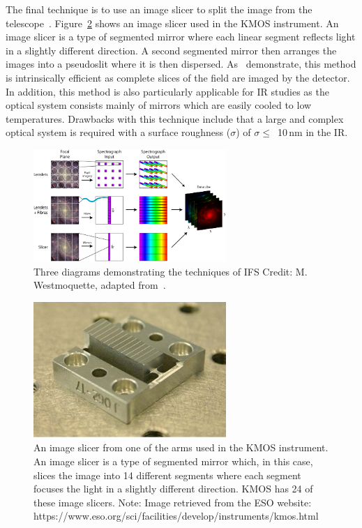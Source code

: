 The final technique is to use an image slicer to split the image from the telescope~\citep{1997SPIE.2871.1295C}.
Figure~\ref{fig:image_slicer} shows an image slicer used in the KMOS instrument.
An image slicer is a type of segmented mirror where each linear segment reflects light in a slightly different direction.
A second segmented mirror then arranges the images into a pseudoslit where it is then dispersed.
As~\cite{2006NewAR..50..244A} demonstrate, this method is intrinsically efficient as complete slices of the field are imaged by the detector.
In addition, this method is also particularly applicable for IR studies as the optical system consists mainly of mirrors which are easily cooled to low temperatures.
Drawbacks with this technique include that a large and complex optical system is required with a surface roughness ($\sigma$) of $\sigma \leq$~10\,nm in the IR.


\begin{figure}
 \centering
 \includegraphics[width=0.65\textwidth]{kmos/ifu_designs}
 \caption[Integral Field Spectrosopic methods]{Three diagrams demonstrating the techniques of IFS
 Credit: M. Westmoquette, adapted from~\citep{2006NewAR..50..244A}.
 \label{fig:IFS}}
\end{figure}

\begin{figure}
 \centering
 \includegraphics[width=0.65\textwidth]{kmos/kmos-image-slicer}
 \caption[The KMOS image slicer]{An image slicer from one of the arms used in the KMOS instrument.
 An image slicer is a type of segmented mirror which, in this case, slices the image into 14 different segments where each segment focuses the light in a slightly different direction.
 KMOS has 24 of these image slicers.
 Note: Image retrieved from the ESO website: https://www.eso.org/sci/facilities/develop/instruments/kmos.html
 \label{fig:image_slicer}}
\end{figure}


